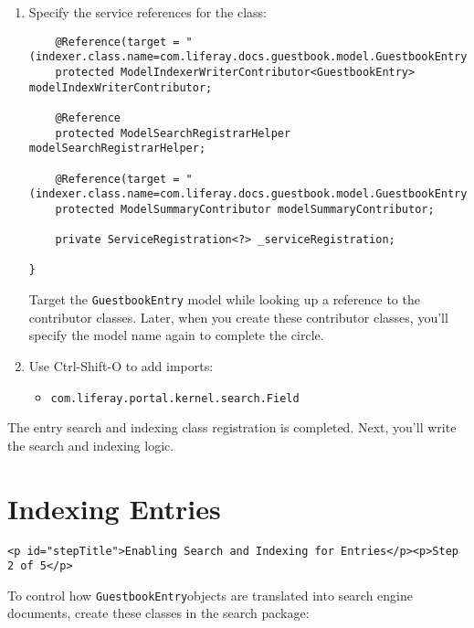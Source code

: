 \begin{enumerate}
\def\labelenumi{\arabic{enumi}.}
\setcounter{enumi}{1}
\item
  Specify the service references for the class:

\begin{verbatim}
    @Reference(target = "(indexer.class.name=com.liferay.docs.guestbook.model.GuestbookEntry)")
    protected ModelIndexerWriterContributor<GuestbookEntry> modelIndexWriterContributor;

    @Reference
    protected ModelSearchRegistrarHelper modelSearchRegistrarHelper;

    @Reference(target = "(indexer.class.name=com.liferay.docs.guestbook.model.GuestbookEntry)")
    protected ModelSummaryContributor modelSummaryContributor;

    private ServiceRegistration<?> _serviceRegistration;

}
\end{verbatim}

  Target the \texttt{GuestbookEntry} model while looking up a reference
  to the contributor classes. Later, when you create these contributor
  classes, you'll specify the model name again to complete the circle.
\item
  Use Ctrl-Shift-O to add imports:

  \begin{itemize}
  \tightlist
  \item
    \texttt{com.liferay.portal.kernel.search.Field}
  \end{itemize}
\end{enumerate}

The entry search and indexing class registration is completed. Next,
you'll write the search and indexing logic.

\chapter{Indexing Entries}\label{indexing-entries}

\begin{verbatim}
<p id="stepTitle">Enabling Search and Indexing for Entries</p><p>Step 2 of 5</p>
\end{verbatim}

To control how \texttt{GuestbookEntry}objects are translated into search
engine documents, create these classes in the search package:

